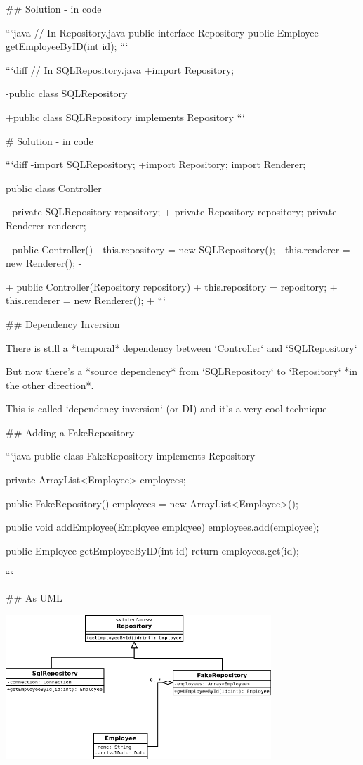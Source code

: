 ## Solution - in code

```java
// In Repository.java
public interface Repository {
    public Employee getEmployeeByID(int id);
}
```

```diff
// In SQLRepository.java
+import Repository;

-public class SQLRepository {
+public class SQLRepository implements Repository {
}
```

# Solution - in code

```diff
-import SQLRepository;
+import Repository;
 import Renderer;

 public class Controller {
-    private SQLRepository repository;
+    private Repository repository;
     private Renderer renderer;

-    public Controller() {
-        this.repository = new SQLRepository();
-        this.renderer = new Renderer();
-   }

+    public Controller(Repository repository) {
+        this.repository = repository;
+        this.renderer = new Renderer();
+    }
```

## Dependency Inversion

There is still a *temporal* dependency between `Controller` and `SQLRepository`

But now there's a *source dependency* from `SQLRepository` to `Repository`
*in the other direction*.

This is called `dependency inversion` (or DI) and it's a very cool technique


## Adding a FakeRepository

```java
public class FakeRepository implements Repository {
    private ArrayList<Employee> employees;

    public FakeRepository() {
        employees = new ArrayList<Employee>();
    }

    public void addEmployee(Employee employee) {
        employees.add(employee);
    }

    public Employee getEmployeeByID(int id) {
        return employees.get(id);
    }
}
```

## As UML


\includegraphics[width=10cm]{img/uml/employee-render-3.png}

}}
